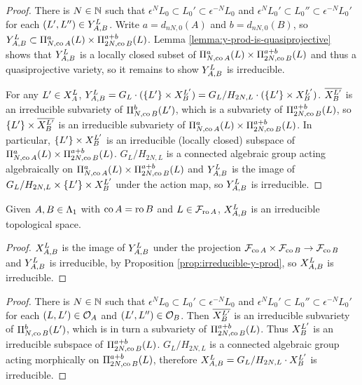 \documentclass[a4paper, 11pt]{report}
\begin{document}
\begin{proof}
There is $N\in\naturals$ such that $\epsilon^N L_0\subset L_0'\subset \epsilon^{-N} L_0$ and $\epsilon^N L_0'\subset L_0''\subset\epsilon^{-N}L_0'$ for each $(L',L'')\in\yprod[L]{A,B}$. Write $a=d_{nN,0}(A)$ and $b=d_{nN,0}(B)$, so $\yprod[L]{A,B}\subset\Pi_{N,\co{A}}^a(L)\times\Pi_{2N,\co{B}}^{a+b}(L)$. Lemma \ref{lemma:y-prod-is-quasiprojective} shows that $\yprod[L]{A,B}$ is a locally closed subset of $\Pi_{N,\co{A}}^a(L)\times\Pi_{2N,\co{B}}^{a+b}(L)$ and thus a quasiprojective variety, so it remains to show $\yprod[L]{A,B}$ is irreducible.

For any $L'\in\xprod[L]{A}$, $\yprod[L]{A,B}=G_L\cdot (\{L'\}\times\xprod[L']{B}) = G_L/{H_{2N,L}}\cdot (\{L'\}\times\xprod[L']{B})$. $\overline{\xprod[L']{B}}$ is an irreducible subvariety of $\Pi_{N,\co{B}}^b(L')$, which is a subvariety of $\Pi_{2N,\co{B}}^{a+b}(L)$, so $\{L'\}\times\overline{\xprod[L']{B}}$ is an irreducible subvariety of $\Pi_{N,\co{A}}^a(L)\times\Pi_{2N,\co{B}}^{a+b}(L)$. In particular, $\{L'\}\times\xprod[L']{B}$ is an irreducible (locally closed) subspace of $\Pi_{N,\co{A}}^a(L)\times\Pi_{2N,\co{B}}^{a+b}(L)$. $G_L/{H_{2N,L}}$ is a connected algebraic group acting algebraically on $\Pi_{N,\co{A}}^a(L)\times\Pi_{2N,\co{B}}^{a+b}(L)$ and $\yprod[L]{A,B}$ is the image of $G_L/{H_{2N,L}}\times\{L'\}\times\xprod[L']{B}$ under the action map, so $\yprod[L]{A,B}$ is irreducible. 
\end{proof}

\begin{lemma}\label{lemma:irreducible-x-prod}
Given $A,B\in\matrices$ with $\co{A}=\ro{B}$ and $L\in\flags_{\ro{A}}$, $\xprod[L]{A,B}$ is an irreducible topological space.
\end{lemma}

\begin{proof}
$\xprod[L]{A,B}$ is the image of $\yprod[L]{A,B}$ under the projection $\flags_{\co{A}}\times\flags_{\co{B}}\to\flags_{\co{B}}$ and $\yprod[L]{A,B}$ is irreducible, by Proposition \ref{prop:irreducible-y-prod}, so $\xprod[L]{A,B}$ is irreducible.
\end{proof}

\begin{proof}
There is $N\in\naturals$ such that $\epsilon^N L_0\subset L_0'\subset \epsilon^{-N}L_0$ and $\epsilon^N L_0'\subset L_0''\subset \epsilon^{-N}L_0'$ for each $(L,L')\in\orbit{A}$ and $(L',L'')\in\orbit{B}$. Then $\overline{\xprod[L']{B}}$ is an irreducible subvariety of $\Pi_{N,\co{B}}^b(L')$, which is in turn a subvariety of $\Pi_{2N,\co{B}}^{a+b}(L)$. Thus $\xprod[L']{B}$ is an irreducible subspace of $\Pi_{2N,\co{B}}^{a+b}(L)$. $G_L/{H_{2N,L}}$ is a connected algebraic group acting morphically on $\Pi_{2N,\co{B}}^{a+b}(L)$, therefore $\xprod[L]{A,B} = G_L/{H_{2N,L}}\cdot\xprod[L']{B}$ is irreducible.
\end{proof}
\end{document}
